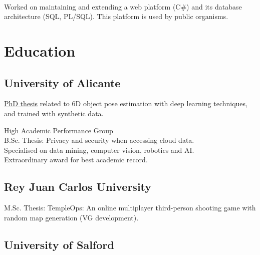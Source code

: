 \documentclass[]{deedy-resume-openfont}
\begin{document}
\begin{minipage}[t]{0.495\textwidth}
\\
\begin{tightemize}
	\item Worked on maintaining and extending a web platform (C\#) and its database architecture (SQL, PL/SQL). This platform is used by public organisms.
\end{tightemize}


\sectionsep

\section{Education} 

\subsection{University of Alicante}
\href{http://rua.ua.es/dspace/handle/10045/133830}{ PhD thesis} related to 6D object pose estimation with deep learning techniques, and trained with synthetic data.

\sectionsep

High Academic Performance Group \\
B.Sc. Thesis: Privacy and security when accessing cloud data.\\
Specialised on data mining, computer vision, robotics and AI.\\
Extraordinary award for best academic record.

\sectionsep


\sectionsep

\subsection{Rey Juan Carlos University}
M.Sc. Thesis: TempleOps: An online multiplayer third-person shooting game with random map generation (VG development).

\sectionsep

\subsection{University of Salford}


\end{minipage}
\end{document}
